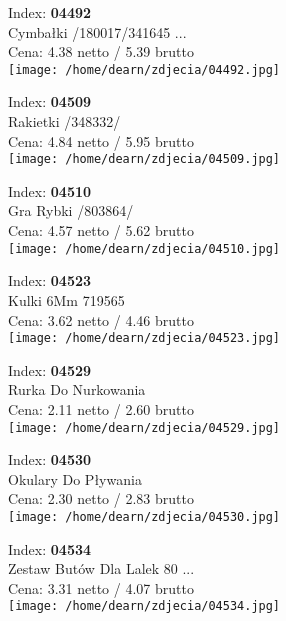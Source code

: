 {Index: \textbf{04492}\\
Cymbałki   /180017/341645 ...\\
Cena: 4.38 netto / 5.39 brutto\\
  \texttt{[image: /home/dearn/zdjecia/04492.jpg]}}\newline\newline

{Index: \textbf{04509}\\
Rakietki   /348332/\\
Cena: 4.84 netto / 5.95 brutto\\
  \texttt{[image: /home/dearn/zdjecia/04509.jpg]}}\newline\newline

{Index: \textbf{04510}\\
Gra Rybki    /803864/\\
Cena: 4.57 netto / 5.62 brutto\\
  \texttt{[image: /home/dearn/zdjecia/04510.jpg]}}\newline\newline

{Index: \textbf{04523}\\
Kulki 6Mm 719565\\
Cena: 3.62 netto / 4.46 brutto\\
  \texttt{[image: /home/dearn/zdjecia/04523.jpg]}}\newline\newline

{Index: \textbf{04529}\\
Rurka Do Nurkowania\\
Cena: 2.11 netto / 2.60 brutto\\
  \texttt{[image: /home/dearn/zdjecia/04529.jpg]}}\newline\newline

{Index: \textbf{04530}\\
Okulary Do Pływania\\
Cena: 2.30 netto / 2.83 brutto\\
  \texttt{[image: /home/dearn/zdjecia/04530.jpg]}}\newline\newline

{Index: \textbf{04534}\\
Zestaw Butów Dla Lalek 80 ...\\
Cena: 3.31 netto / 4.07 brutto\\
  \texttt{[image: /home/dearn/zdjecia/04534.jpg]}}\newline\newline

